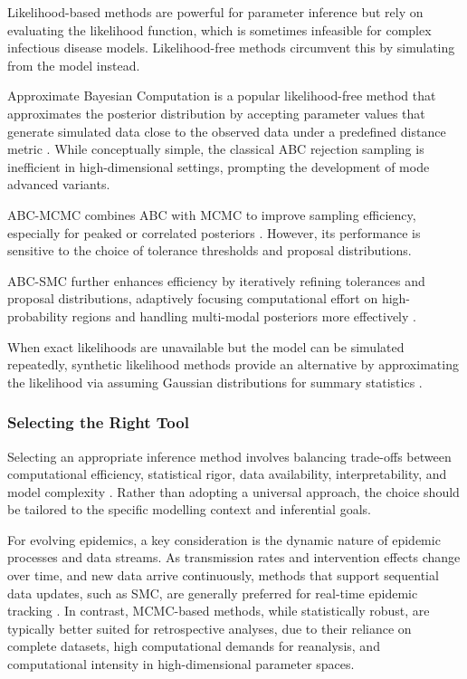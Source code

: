 \documentclass{article}
\begin{document}
Likelihood-based methods are powerful for parameter inference but rely on evaluating the likelihood function, which is sometimes infeasible for complex infectious disease models. Likelihood-free methods circumvent this by simulating from the model instead.

Approximate Bayesian Computation is a popular likelihood-free method that approximates the posterior distribution by accepting parameter values that generate simulated data close to the observed data under a predefined distance metric \citep{rubin1984bayesianly, tavare1997inferring, beaumont2002approximate}. While conceptually simple, the classical ABC rejection sampling is inefficient in high-dimensional settings, prompting the development of mode advanced variants. 

ABC-MCMC combines ABC with MCMC to improve sampling efficiency, especially for peaked or correlated posteriors \citep{marjoram2003markov, wegmann2009efficient, kypraios2017tutorial}. However, its performance is sensitive to the choice of tolerance thresholds and proposal distributions.

ABC-SMC further enhances efficiency by iteratively refining  tolerances and proposal distributions, adaptively focusing computational effort on high-probability regions and handling multi-modal posteriors more effectively \citep{sisson2007sequential, toni2009approximate, beaumont2009adaptive, drovandi2011likelihood}. 

When exact likelihoods are unavailable but the model can be simulated repeatedly, synthetic likelihood methods provide an alternative by approximating the likelihood via assuming Gaussian distributions for summary statistics \citep{wood2010statistical, price2018bayesian}. 

\subsubsection{Selecting the Right Tool}

Selecting an appropriate inference method involves balancing trade-offs between computational efficiency, statistical rigor, data availability, interpretability, and model complexity \citep{funk2020choices}. Rather than adopting a universal approach, the choice should be tailored to the specific modelling context and inferential goals. 

For evolving epidemics, a key consideration is the dynamic nature of epidemic processes and data streams. As transmission rates and intervention effects change over time, and new data arrive continuously, methods that support sequential data updates, such as SMC, are generally preferred for real-time epidemic tracking \citep{birrell2020efficient, storvik2023sequential}. In contrast, MCMC-based methods, while statistically robust, are typically better suited for retrospective analyses, due to their reliance on complete datasets, high computational demands for reanalysis, and computational intensity in high-dimensional parameter spaces. 
\end{document}
